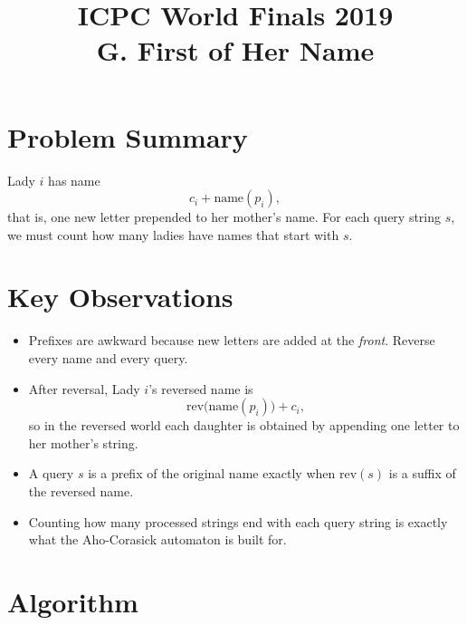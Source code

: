 \documentclass[11pt]{article}
\title{ICPC World Finals 2019\\G. First of Her Name}
\author{}
\date{}
\begin{document}
\maketitle

\section*{Problem Summary}

Lady $i$ has name
\[
c_i + \text{name}(p_i),
\]
that is, one new letter prepended to her mother's name. For each query string $s$, we must count how many ladies have names that start with $s$.

\section*{Key Observations}

\begin{itemize}[leftmargin=*]
    \item Prefixes are awkward because new letters are added at the \emph{front}. Reverse every name and every query.
    \item After reversal, Lady $i$'s reversed name is
    \[
    \text{rev(name}(p_i)) + c_i,
    \]
    so in the reversed world each daughter is obtained by appending one letter to her mother's string.
    \item A query $s$ is a prefix of the original name exactly when $\text{rev}(s)$ is a suffix of the reversed name.
    \item Counting how many processed strings end with each query string is exactly what the Aho-Corasick automaton is built for.
\end{itemize}

\section*{Algorithm}
\end{document}
